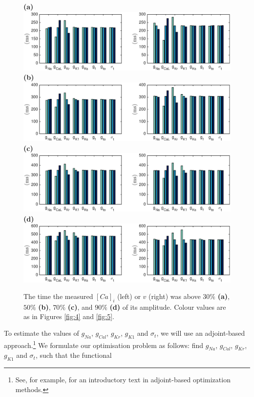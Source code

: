 \documentclass[12pt,a4paper]{article}
\begin{document}
\begin{figure}
 \textbf{(a)}  \includegraphics[trim=1cm 0cm 2cm 0cm, clip=true, width=1\linewidth]{30p} 
 \textbf{(b)}  \includegraphics[trim=1cm 0cm 2cm 0cm, clip=true, width=1\linewidth]{50p} 
 \textbf{(c)}   \includegraphics[trim=1cm 0cm 2cm 0cm, clip=true, width=1\linewidth]{70p} 
  \textbf{(d)}   \includegraphics[trim=1cm 0cm 2cm 0cm, clip=true, width=1\linewidth]{90p} 
    \caption{The time the measured $[Ca]_i$ (left) or $v$ (right) was above $30\%$ \textbf{(a)}, $50\%$ \textbf{(b)}, $70\%$ \textbf{(c)}, and $90\%$ \textbf{(d)} of its amplitude. Colour values are as in Figures \ref{fig:4} and \ref{fig:5}.}
    \label{fig:7}
\end{figure}
\newline
To estimate the values of $g_{Na}$, $g_{Cal}$, $g_{Kr}$, $g_{K1}$ and $\sigma_t$, we will use an adjoint-based approach.\footnote{See, for example, \cite{Gunzburger} for an introductory text in adjoint-based optimization methods.} We formulate our optimisation problem as follows: find $g_{Na}$, $g_{Cal}$, $g_{Kr}$, $g_{K1}$ and $\sigma_t$, such that the functional
\end{document}
